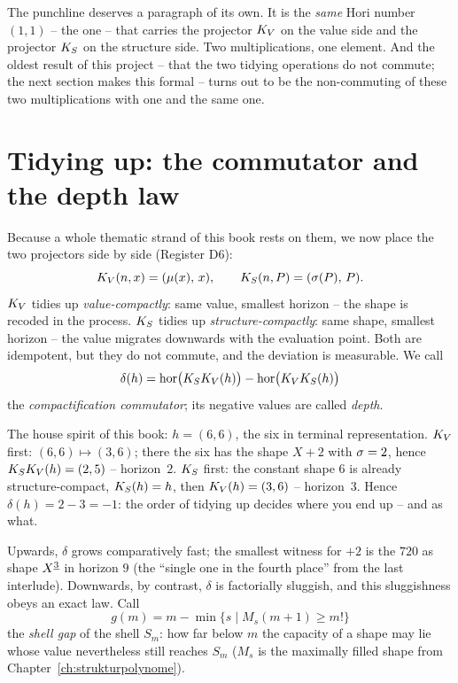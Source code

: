 The punchline deserves a paragraph of its own. It is the
\emph{same} Hori number $(1,1)$ -- the one -- that carries the
projector $K_V$ on the value side and the projector $K_S$ on the
structure side. Two multiplications, one element. And the oldest
result of this project -- that the two tidying operations do not
commute; the next section makes this formal -- turns out to be the
non-commuting of these two multiplications with one and the same
one.

\section{Tidying up: the commutator and the depth law}
\label{sec:kommutator}

Because a whole thematic strand of this book rests on them, we now
place the two projectors side by side (Register D6):
\[
K_V(n,x)=(\mu(x),\,x),
\qquad
K_S(n,P)=(\sigma(P),\,P).
\]
$K_V$ tidies up \emph{value-compactly}: same value, smallest
horizon -- the shape is recoded in the process. $K_S$ tidies up
\emph{structure-compactly}: same shape, smallest horizon -- the
value migrates downwards with the evaluation point. Both are
idempotent, but they do not commute, and the deviation is
measurable. We call
\[
\delta(h)=\operatorname{hor}\bigl(K_SK_V(h)\bigr)-\operatorname{hor}\bigl(K_VK_S(h)\bigr)
\]
the \emph{compactification commutator}; its negative values are
called \emph{depth}.

\begin{beispiel}
The house spirit of this book: $h=(6,6)$, the six in terminal
representation. $K_V$ first: $(6,6)\mapsto(3,6)$; there the six has
the shape $X{+}2$ with $\sigma=2$, hence
$K_SK_V(h)=(2,5)$ -- horizon~$2$. $K_S$ first: the constant shape
$6$ is already structure-compact, $K_S(h)=h$, then
$K_V(h)=(3,6)$ -- horizon~$3$. Hence $\delta(h)=2-3=-1$: the order
of tidying up decides where you end up -- and as what.
\end{beispiel}

Upwards, $\delta$ grows comparatively fast; the smallest witness
for $+2$ is the $720$ as shape $X^{\underline{3}}$ in horizon $9$
(the ``single one in the fourth place'' from the last
interlude). Downwards, by contrast, $\delta$ is factorially
sluggish, and this sluggishness obeys an exact law. Call
\[
g(m)=m-\min\{s\mid M_s(m{+}1)\ge m!\}
\]
the \emph{shell gap} of the shell $S_m$: how far below $m$ the
capacity of a shape may lie whose value nevertheless still reaches
$S_m$ ($M_s$ is the maximally filled shape from
Chapter~\ref{ch:strukturpolynome}).

